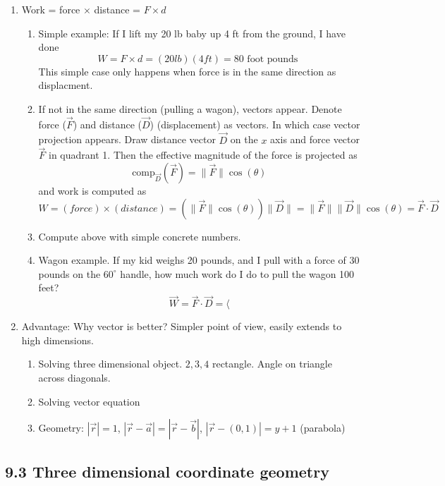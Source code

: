 \documentclass{article}
\begin{document}
\begin{enumerate}
\item Work = force $\times$ distance = $F \times d$
\begin{enumerate}
\item Simple example: If I lift my 20 lb baby up 4 ft from the ground, I have done
\[
W = F \times d = (20 lb) (4 ft) = 80 \text{ foot pounds }
\]
This simple case only happens when force is in the same direction as displacment. 
\item If not in the same direction (pulling a wagon), vectors appear. Denote force ($\vec{F}$) and distance ($\vec{D}$) (displacement) as vectors. In which case vector projection appears. Draw distance vector $\vec{D}$ on the $x$ axis and force vector $\vec{F}$ in quadrant 1. Then the effective magnitude of the force is projected as 
\[
\text{comp}_{\vec{D}} (\vec{F}) = \|\vec{F} \| \cos(\theta)
\]
and work is computed as
\[
W = (force) \times (distance) = (\| \vec{F} \| \cos(\theta)) \|\vec{D}\| = \|\vec{F}\| \| \vec{D} \| \cos(\theta) = \vec{F} \cdot \vec{D}
\]
\item Compute above with simple concrete numbers.
\item Wagon example. If my kid weighs 20 pounds, and I pull with a force of 30 pounds on the $60^{\circ}$ handle, how much work do I do to pull the wagon 100 feet?
\[
\vec{W} = \vec{F} \cdot \vec{D} = \langle 
\]
\end{enumerate}

\item Advantage: Why vector is better? Simpler point of view, easily extends to high dimensions.
\begin{enumerate}
\item Solving three dimensional object. $2,3,4$ rectangle. Angle on triangle across diagonals.
\item Solving vector equation
\item Geometry: $|\vec r| = 1$, $|\vec r-\vec a| = |\vec r-\vec b|$, $|\vec r-(0,1)| = y+1$ (parabola)
\end{enumerate}
\end{enumerate}


\subsection{9.3 Three dimensional coordinate geometry}
\end{document}
